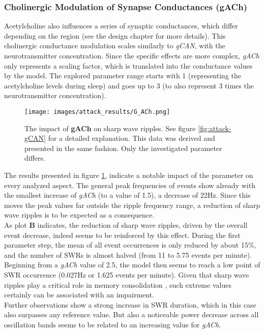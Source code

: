         \subsubsection{Cholinergic Modulation of Synapse Conductances (gACh)}
        Acetylcholine also influences a series of synaptic conductances, which differ depending on the region (see the design chapter for more details). This cholinergic conductance modulation scales similarly to \textit{gCAN}, with the neurotransmitter concentration. Since the specific effects are more complex, \textit{gACh} only represents a scaling factor, which is translated into the conductance values by the model. The explored parameter range starts with 1 (representing the acetylcholine levels during sleep) and goes up to 3 (to also represent 3 times the neurotransmitter concentration).
        
        \begin{figure}[htbp]
            \centering
            \texttt{[image: images/attack\_results/G\_ACh.png]}
            \caption{The impact of \textbf{gACh} on sharp wave ripples. See figure \ref{fig:attack-gCAN} for a detailed explanation. This data was derived and presented in the same fashion. Only the investigated parameter differs.}
            \label{fig:attack-gACh}
        \end{figure}
        The results presented in figure \ref{fig:attack-gACh}, indicate a notable impact of the parameter on every analyzed aspect. The general peak frequencies of events show already with the smallest increase of \textit{gACh} (to a value of 1.5), a decrease of 22Hz. Since this moves the peak values far outside the ripple frequency range, a reduction of sharp wave ripples is to be expected as a consequence.\\
        As plot \textbf{B} indicates, the reduction of sharp wave ripples, driven by the overall event decrease, indeed seems to be reinforced by this effect. During the first parameter step, the mean of all event occurrences is only reduced by about 15\%, and the number of SWRs is almost halved (from 11 to 5.75 events per minute). Beginning from a \textit{gACh} value of 2.5, the model then seems to reach a low point of SWR occurrence (0.027Hz or 1.625 events per minute). Given that sharp wave ripples play a critical role in memory consolidation \cite{Girardeau.2011}, such extreme values certainly can be associated with an impairment.\\
        Further observations show a strong increase in SWR duration, which in this case also surpasses any reference value. But also a noticeable power decrease across all oscillation bands seems to be related to an increasing value for \textit{gACh}.


